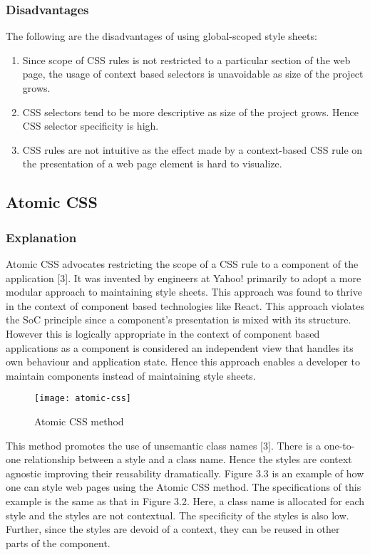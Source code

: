 \documentclass[12pt]{article}
\begin{document}
\subsubsection{Disadvantages}
The following are the disadvantages of using global-scoped style sheets:
\begin{enumerate}
	\item Since scope of CSS rules is not restricted to a particular section of the web page, the usage of context based selectors is unavoidable as size of the project grows.

	\item CSS selectors tend to be more descriptive as size of the project grows. Hence CSS selector specificity is high.

	\item CSS rules are not intuitive as the effect made by a context-based CSS rule on the presentation of a web page element is hard to visualize.
\end{enumerate}

\subsection{Atomic CSS}
\subsubsection{Explanation}
Atomic CSS advocates restricting the scope of a CSS rule to a component of the application [3]. It was invented by engineers at Yahoo! primarily to adopt a more modular approach to maintaining style sheets. This approach was found to thrive in the context of component based technologies like React. This approach violates the SoC principle since a component's presentation is mixed with its structure. However this is logically appropriate in the context of component based applications as a component is considered an independent view that handles its own behaviour and application state. Hence this approach enables a developer to maintain components instead of maintaining style sheets.

\vspace{0.5cm}

\begin{figure}[h]
\texttt{[image: atomic-css]}
\centering
\caption{Atomic CSS method}
\end{figure}

\vspace{0.5cm}

This method promotes the use of unsemantic class names [3]. There is a one-to-one relationship between a style and a class name. Hence the styles are context agnostic improving their reusability dramatically. Figure 3.3 is an example of how one can style web pages using the Atomic CSS method. The specifications of this example is the same as that in Figure 3.2. Here, a class name is allocated for each style and the styles are not contextual. The specificity of the styles is also low. Further, since the styles are devoid of a context, they can be reused in other parts of the component.
\end{document}
